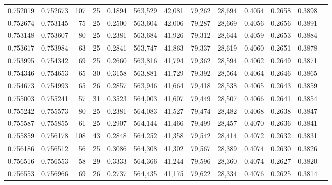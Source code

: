 \begin{tabular}{rrrrrrrrrrrrr}
0.752019 & 0.752673 &   107 &  25 &                                     0.1894 & 563,529 &  42,081 &  79,262 &  28,694 & 0.4054 & 0.2658 & 0.3898 \\
0.752674 & 0.753145 &    75 &  25 &                                     0.2500 & 563,604 &  42,006 &  79,287 &  28,669 & 0.4056 & 0.2656 & 0.3891 \\
0.753148 & 0.753607 &    80 &  25 &                                     0.2381 & 563,684 &  41,926 &  79,312 &  28,644 & 0.4059 & 0.2653 & 0.3884 \\
0.753617 & 0.753984 &    63 &  25 &                                     0.2841 & 563,747 &  41,863 &  79,337 &  28,619 & 0.4060 & 0.2651 & 0.3878 \\
0.753995 & 0.754342 &    69 &  25 &                                     0.2660 & 563,816 &  41,794 &  79,362 &  28,594 & 0.4062 & 0.2649 & 0.3871 \\
0.754346 & 0.754653 &    65 &  30 &                                     0.3158 & 563,881 &  41,729 &  79,392 &  28,564 & 0.4064 & 0.2646 & 0.3865 \\
0.754673 & 0.754993 &    65 &  26 &                                     0.2857 & 563,946 &  41,664 &  79,418 &  28,538 & 0.4065 & 0.2643 & 0.3859 \\
0.755003 & 0.755241 &    57 &  31 &                                     0.3523 & 564,003 &  41,607 &  79,449 &  28,507 & 0.4066 & 0.2641 & 0.3854 \\
0.755242 & 0.755573 &    80 &  25 &                                     0.2381 & 564,083 &  41,527 &  79,474 &  28,482 & 0.4068 & 0.2638 & 0.3847 \\
0.755587 & 0.755855 &    61 &  25 &                                     0.2907 & 564,144 &  41,466 &  79,499 &  28,457 & 0.4070 & 0.2636 & 0.3841 \\
0.755859 & 0.756178 &   108 &  43 &                                     0.2848 & 564,252 &  41,358 &  79,542 &  28,414 & 0.4072 & 0.2632 & 0.3831 \\
0.756186 & 0.756512 &    56 &  25 &                                     0.3086 & 564,308 &  41,302 &  79,567 &  28,389 & 0.4074 & 0.2630 & 0.3826 \\
0.756516 & 0.756553 &    58 &  29 &                                     0.3333 & 564,366 &  41,244 &  79,596 &  28,360 & 0.4074 & 0.2627 & 0.3820 \\
0.756553 & 0.756966 &    69 &  26 &                                     0.2737 & 564,435 &  41,175 &  79,622 &  28,334 & 0.4076 & 0.2625 & 0.3814 \\

\end{tabular}
